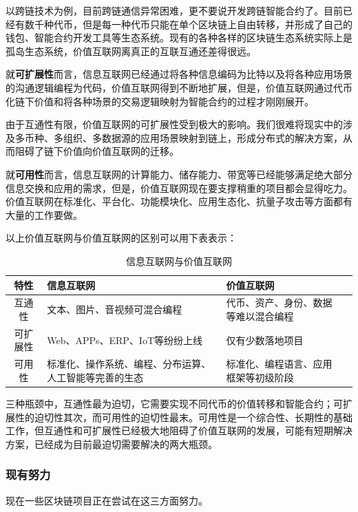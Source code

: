 \documentclass[a4paper,12pt]{article}
\begin{document}
以跨链技术为例，目前跨链通信异常困难，更不要说开发跨链智能合约了。目前已经有数千种代币，但是每一种代币只能在单个区块链上自由转移，并形成了自己的钱包、智能合约开发工具等生态系统。现有的各种各样的区块链生态系统实际上是孤岛生态系统，价值互联网离真正的互联互通还差得很远。

就\textbf{可扩展性}而言，信息互联网已经通过将各种信息编码为比特以及将各种应用场景的沟通逻辑编程为代码，价值互联网得到不断地扩展，但是，价值互联网通过代币化链下价值和将各种场景的交易逻辑映射为智能合约的过程才刚刚展开。

由于互通性有限，价值互联网的可扩展性受到极大的影响。我们很难将现实中的涉及多币种、多组织、多数据源的应用场景映射到链上，形成分布式的解决方案，从而阻碍了链下价值向价值互联网的迁移。

就\textbf{可用性}而言，信息互联网的计算能力、储存能力、带宽等已经能够满足绝大部分信息交换和应用的需求，但是，价值互联网现在要支撑稍重的项目都会显得吃力。价值互联网在标准化、平台化、功能模块化、应用生态化、抗量子攻击等方面都有大量的工作要做。

以上价值互联网与价值互联网的区别可以用下表表示：
\renewcommand\tablename{表}
\begin{table}[!hpb]\small
  \caption{信息互联网与价值互联网}
  \label{tbl:keyproblems}
  \centering
  \begin{tabular}{|c|p{}|l|p{}|}
\hline
特性&信息互联网&价值互联网 \\
\hline
互通性&文本、图片、音视频可混合编程& 代币、资产、身份、数据等难以混合编程\\  
可扩展性&Web、APPs、ERP、IoT等纷纷上线& 仅有少数落地项目\\  
可用性&标准化、操作系统、编程、分布运算、人工智能等完善的生态& 标准化、编程语言、应用框架等初级阶段\\  
\hline
 \end{tabular}
\end{table}

三种瓶颈中，互通性最为迫切，它需要实现不同代币的价值转移和智能合约；可扩展性的迫切性其次，而可用性的迫切性最末。可用性是一个综合性、长期性的基础工作，但互通性和可扩展性已经极大地阻碍了价值互联网的发展，可能有短期解决方案，已经成为目前最迫切需要解决的两大瓶颈。

\subsubsection{现有努力}

现在一些区块链项目正在尝试在这三方面努力。
\end{document}

